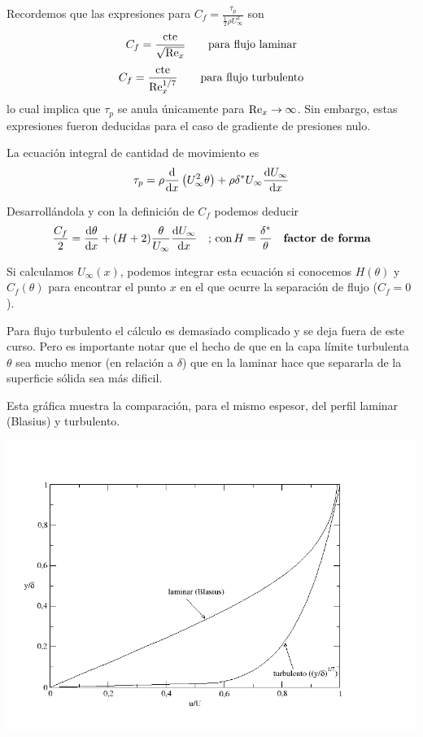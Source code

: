 	
	Recordemos que las expresiones para $C_{f}=\frac{\tau_{p}}{\frac{1}{2}\rho U_{\infty}^{2}}$
	son 
	\[
	C_{f}=\frac{\text{cte}}{\sqrt{\text{Re}_{x}}}\qquad\text{para flujo laminar}
	\]
	\[
	C_{f}=\frac{\text{cte}}{\text{Re}_{x}^{1/7}}\qquad\text{para flujo turbulento}
	\]
	lo cual implica que $\tau_{p}$ se anula únicamente para $\text{Re}_{x}\rightarrow\infty$.
	Sin embargo, estas expresiones fueron deducidas para el caso de gradiente
	de presiones nulo.
	
	La ecuación integral de cantidad de movimiento es 
	\[
	\tau_{p}=\rho\frac{\textrm{d} }{\textrm{d} x}\left(U_{\infty}^{2}\theta\right)+\rho\delta^{*}U_{\infty}\frac{\textrm{d} U_{\infty}}{\textrm{d} x}
	\]
	
	Desarrollándola y con la definición de $C_{f}$ podemos deducir 
	\[
	\frac{C_{f}}{2}=\frac{\textrm{d} \theta}{\textrm{d} x}+(H+2)\frac{\theta}{U_{\infty}}\frac{\textrm{d} U_{\infty}}{\textrm{d} x}\quad\text{; con}\,H=\frac{\delta^{*}}{\theta}\quad\textbf{factor de forma}
	\]
	
	
	Si calculamos $U_{\infty}(x)$, podemos integrar esta ecuación si
	conocemos $H(\theta)$ y $C_{f}(\theta)$ para encontrar el punto
	$x$ en el que ocurre la separación de flujo ($C_{f}=0$).\medskip{}
	


			Para flujo turbulento el cálculo es demasiado complicado y se deja
			fuera de este curso. Pero es importante notar que el hecho de que
			en la capa límite turbulenta $\theta$ sea mucho menor (en relación
			a $\delta$) que en la laminar hace que separarla de la superficie
			sólida sea más dificil. %

Esta gráfica muestra la comparación, para el mismo espesor, del perfil laminar (Blasius) y turbulento.

\begin{center}
	\includegraphics[width=0.7\linewidth]{TeX_files/chapter08-CapaLimite/Figures/perfiles}
\end{center}


